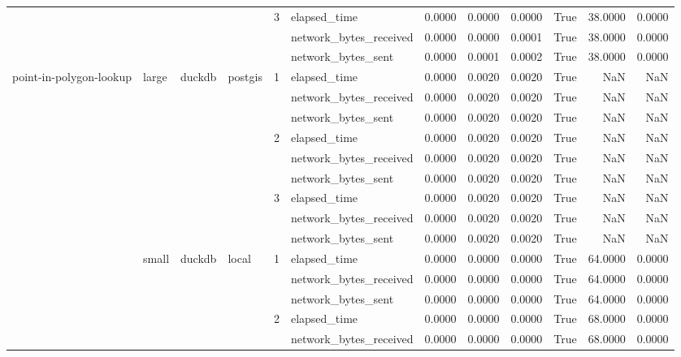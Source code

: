 \begin{tabular}{llllllrrrrrr}
\cline{5-12}
 &  &  &  & \multirow[t]{3}{*}{3} & elapsed_time & 0.0000 & 0.0000 & 0.0000 & True & 38.0000 & 0.0000 \\
 &  &  &  &  & network_bytes_received & 0.0000 & 0.0000 & 0.0001 & True & 38.0000 & 0.0000 \\
 &  &  &  &  & network_bytes_sent & 0.0000 & 0.0001 & 0.0002 & True & 38.0000 & 0.0000 \\
\cline{1-12} \cline{2-12} \cline{3-12} \cline{4-12} \cline{5-12}
\multirow[t]{36}{*}{point-in-polygon-lookup} & \multirow[t]{9}{*}{large} & \multirow[t]{9}{*}{duckdb} & \multirow[t]{9}{*}{postgis} & \multirow[t]{3}{*}{1} & elapsed_time & 0.0000 & 0.0020 & 0.0020 & True & NaN & NaN \\
 &  &  &  &  & network_bytes_received & 0.0000 & 0.0020 & 0.0020 & True & NaN & NaN \\
 &  &  &  &  & network_bytes_sent & 0.0000 & 0.0020 & 0.0020 & True & NaN & NaN \\
\cline{5-12}
 &  &  &  & \multirow[t]{3}{*}{2} & elapsed_time & 0.0000 & 0.0020 & 0.0020 & True & NaN & NaN \\
 &  &  &  &  & network_bytes_received & 0.0000 & 0.0020 & 0.0020 & True & NaN & NaN \\
 &  &  &  &  & network_bytes_sent & 0.0000 & 0.0020 & 0.0020 & True & NaN & NaN \\
\cline{5-12}
 &  &  &  & \multirow[t]{3}{*}{3} & elapsed_time & 0.0000 & 0.0020 & 0.0020 & True & NaN & NaN \\
 &  &  &  &  & network_bytes_received & 0.0000 & 0.0020 & 0.0020 & True & NaN & NaN \\
 &  &  &  &  & network_bytes_sent & 0.0000 & 0.0020 & 0.0020 & True & NaN & NaN \\
\cline{2-12} \cline{3-12} \cline{4-12} \cline{5-12}
 & \multirow[t]{27}{*}{small} & \multirow[t]{18}{*}{duckdb} & \multirow[t]{9}{*}{local} & \multirow[t]{3}{*}{1} & elapsed_time & 0.0000 & 0.0000 & 0.0000 & True & 64.0000 & 0.0000 \\
 &  &  &  &  & network_bytes_received & 0.0000 & 0.0000 & 0.0000 & True & 64.0000 & 0.0000 \\
 &  &  &  &  & network_bytes_sent & 0.0000 & 0.0000 & 0.0000 & True & 64.0000 & 0.0000 \\
\cline{5-12}
 &  &  &  & \multirow[t]{3}{*}{2} & elapsed_time & 0.0000 & 0.0000 & 0.0000 & True & 68.0000 & 0.0000 \\
 &  &  &  &  & network_bytes_received & 0.0000 & 0.0000 & 0.0000 & True & 68.0000 & 0.0000 \\

\end{tabular}
